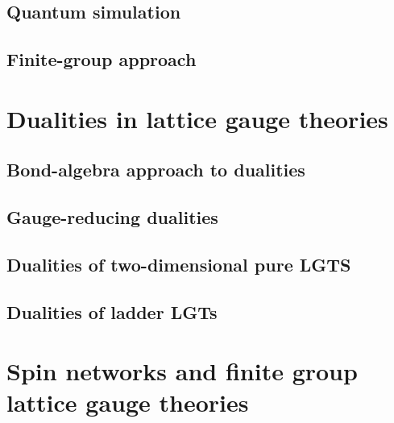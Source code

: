 \documentclass{book}
\begin{document}
\section{Quantum simulation}
\label{sec:quantum_simulation}


\section{Finite-group approach}
\label{sec:finite_group_approach}




\chapter{Dualities in lattice gauge theories}
\label{chap:dualities_in_lattice_gauge_theories}

\section{Bond-algebra approach to dualities}
\label{sec:bond_algebra_approach_to_dualities}

\section{Gauge-reducing dualities}
\label{sec:gauge_reducing_dualities}

\section{Dualities of two-dimensional pure LGTS}
\label{sec:dualities_of_two_dimensional_pure_lgts}

\section{Dualities of ladder LGTs}
\label{sec:dualities_of_ladder_lgts}


\chapter{Spin networks and finite group lattice gauge theories}
\label{chap:spin_networks_and_finite_group_lattice_gauge_theories}
\end{document}
